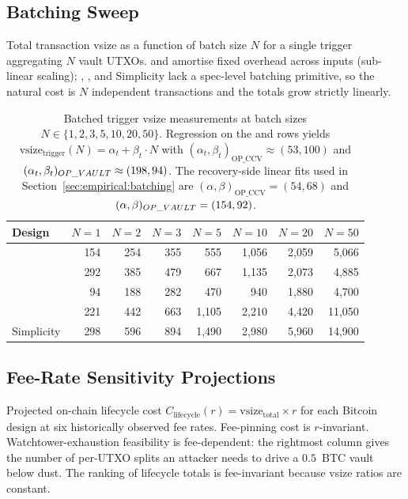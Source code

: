 \subsection{Batching Sweep}
\label{app:meas:batching}

Total transaction vsize as a function of batch size $N$ for a
single trigger aggregating $N$ vault UTXOs. \opccv{} and \opvault{}
amortise fixed overhead across inputs (sub-linear scaling); \opctv{},
\catcsfs{}, and Simplicity lack a spec-level batching primitive, so
the natural cost is $N$ independent transactions and the totals
grow strictly linearly.

\begin{table}[h]
\centering
\caption{Batched trigger vsize measurements at batch sizes
$N \in \{1, 2, 3, 5, 10, 20, 50\}$. Regression on the \opccv{} and
\opvault{} rows yields $\text{vsize}_{\text{trigger}}(N) =
\alpha_t + \beta_t \cdot N$ with
$(\alpha_t, \beta_t)_{\mathrm{OP\_CCV}} \approx (53, 100)$\vB{} and
$(\alpha_t, \beta_t)_{OP\_VAULT{}} \approx (198, 94)$\vB{}. The
recovery-side linear fits used in
Section~\ref{sec:empirical:batching} are
$(\alpha, \beta)_{\mathrm{OP\_CCV}} = (54, 68)$\vB{} and
$(\alpha, \beta)_{OP\_VAULT{}} = (154, 92)$\vB{}.}
\label{tab:batching_appendix}
\footnotesize
\setlength{\tabcolsep}{4pt}
\begin{tabular}{@{}lrrrrrrr@{}}
\toprule
Design    & $N{=}1$ & $N{=}2$ & $N{=}3$ & $N{=}5$ & $N{=}10$ & $N{=}20$ & $N{=}50$ \\
\midrule
\opccv{}       & 154 & 254  & 355   & 555    & 1{,}056  & 2{,}059  & 5{,}066 \\
\opvault{} & 292 & 385  & 479   & 667    & 1{,}135  & 2{,}073  & 4{,}885 \\
\midrule
\opctv{}       & 94  & 188  & 282   & 470    & 940      & 1{,}880  & 4{,}700 \\
\catcsfs{}  & 221 & 442  & 663   & 1{,}105 & 2{,}210 & 4{,}420  & 11{,}050 \\
Simplicity & 298 & 596 & 894   & 1{,}490 & 2{,}980 & 5{,}960  & 14{,}900 \\
\bottomrule
\end{tabular}
\end{table}

\subsection{Fee-Rate Sensitivity Projections}
\label{app:meas:fees}

Projected on-chain lifecycle cost
$C_{\text{lifecycle}}(r) = \text{vsize}_{\text{total}} \times r$
for each Bitcoin design at six historically observed fee rates.
Fee-pinning cost is $r$-invariant. Watchtower-exhaustion
feasibility is fee-dependent: the rightmost column gives the
number of per-UTXO splits an attacker needs to drive a $0.5$~BTC
\opccv{} vault below dust. The ranking of lifecycle totals is
fee-invariant because vsize ratios are constant.

